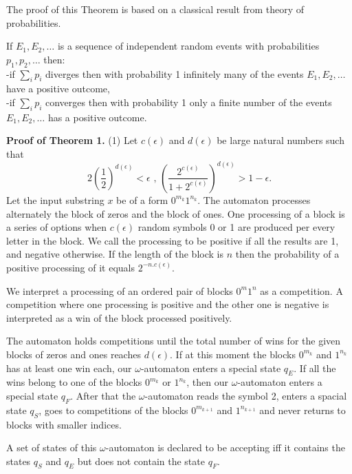\documentclass{llncs}
\begin{document}
\bigskip

The proof of this Theorem is based on a classical result from theory of probabilities.

\bigskip


If $E_1, E_2, \ldots $ is a sequence of independent random events with probabilities  
$p_1, p_2, \ldots $ then:\\
-if $\sum _i p_i$ diverges then with probability 1 infinitely many of the events $E_1, E_2, \ldots $ have a positive outcome,\\
-if $\sum _i p_i$ converges then with probability 1 only a finite number of the events $E_1, E_2, \ldots $ has a positive outcome.


\bigskip



{\bf Proof of Theorem 1.} (1)  Let $c(\epsilon )$ and $d(\epsilon )$ be large natural numbers such that
$$ 
2(\frac{1}{2})^{d(\epsilon )} < \epsilon \mbox{       ,        }  (\frac{2^{c(\epsilon )}}{1+2^{c(\epsilon )}})^{d(\epsilon )} > 1-\epsilon .
$$
Let the input substring $x$ be of a form $0^{m_k}1^{n_k}$. The automaton processes alternately the block of zeros and the block of ones.
One processing of a block is a series of options when $c(\epsilon )$ random symbols 0 or 1 are produced per every letter in the block.
We call the processing to be positive if all the results are 1, and negative otherwise. If the length of the block is $n$ then the probability of a 
positive processing of it equals $2^{-n.c(\epsilon )}$.

We interpret a processing of an ordered pair of blocks $0^m1^n$ as a competition. A competition where one processing is positive and the other one
is negative is interpreted as a win of the block processed positively.

The automaton holds competitions until the total number of wins for the given blocks of zeros and ones reaches $d(\epsilon )$. If at this moment  the
blocks $0^{m_k}$ and $1^{n_k}$ has at least one win each, our $\omega $-automaton enters a special state $q_E$. If all the wins belong to one of the blocks
$0^{m_k}$ or $1^{n_k}$, then our $\omega $-automaton enters a special state $q_F$. After that the $\omega $-automaton reads the symbol 2, enters a spacial state $q_S$, goes to competitions of the blocks $0^{m_{k+1}}$ and $1^{n_{k+1}}$ and never returns to blocks with smaller indices.

A set of states of this  $\omega $-automaton is declared to be accepting iff it contains the states $q_S$ and $q_E$ but does not contain the state $q_F$.
\end{document}
